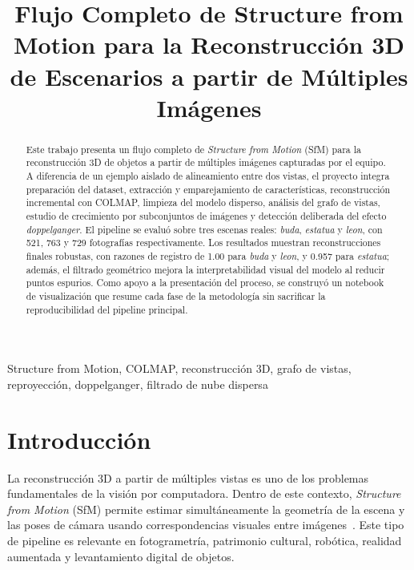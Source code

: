 \documentclass[conference]{IEEEtran}
\begin{document}
\title{Flujo Completo de Structure from Motion para la Reconstrucci\'on 3D de Escenarios a partir de M\'ultiples Im\'agenes}

\author{
}

\maketitle

\begin{abstract}
Este trabajo presenta un flujo completo de \emph{Structure from Motion} (SfM) para la reconstrucci\'on 3D de objetos a partir de m\'ultiples im\'agenes capturadas por el equipo. A diferencia de un ejemplo aislado de alineamiento entre dos vistas, el proyecto integra preparaci\'on del dataset, extracci\'on y emparejamiento de caracter\'isticas, reconstrucci\'on incremental con COLMAP, limpieza del modelo disperso, an\'alisis del grafo de vistas, estudio de crecimiento por subconjuntos de im\'agenes y detecci\'on deliberada del efecto \emph{doppelganger}. El pipeline se evalu\'o sobre tres escenas reales: \emph{buda}, \emph{estatua} y \emph{leon}, con 521, 763 y 729 fotograf\'ias respectivamente. Los resultados muestran reconstrucciones finales robustas, con razones de registro de 1.00 para \emph{buda} y \emph{leon}, y 0.957 para \emph{estatua}; adem\'as, el filtrado geom\'etrico mejora la interpretabilidad visual del modelo al reducir puntos espurios. Como apoyo a la presentaci\'on del proceso, se construy\'o un notebook de visualizaci\'on que resume cada fase de la metodolog\'ia sin sacrificar la reproducibilidad del pipeline principal.
\end{abstract}

\begin{IEEEkeywords}
Structure from Motion, COLMAP, reconstrucci\'on 3D, grafo de vistas, reproyecci\'on, doppelganger, filtrado de nube dispersa
\end{IEEEkeywords}

\section{Introducci\'on}\label{sec:intro}

La reconstrucci\'on 3D a partir de m\'ultiples vistas es uno de los problemas fundamentales de la visi\'on por computadora. Dentro de este contexto, \emph{Structure from Motion} (SfM) permite estimar simult\'aneamente la geometr\'ia de la escena y las poses de c\'amara usando correspondencias visuales entre im\'agenes~\cite{b1,b2}. Este tipo de pipeline es relevante en fotogrametr\'ia, patrimonio cultural, rob\'otica, realidad aumentada y levantamiento digital de objetos.
\end{document}
